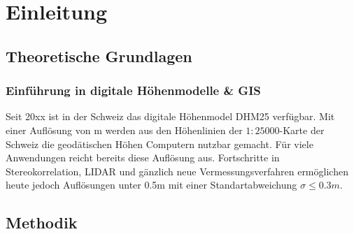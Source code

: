 \section{Einleitung}
\subsection{Theoretische Grundlagen}
\subsubsection{Einführung in digitale Höhenmodelle \& GIS}
Seit 20xx ist in der Schweiz das digitale Höhenmodel DHM25 verfügbar. Mit einer Auflösung von m werden aus den Höhenlinien der $1 : 25000$-Karte der Schweiz die geodätischen Höhen Computern nutzbar gemacht.
Für viele Anwendungen reicht bereits diese Auflösung aus. Fortschritte in Stereokorrelation, LIDAR und gänzlich neue Vermessungsverfahren ermöglichen heute jedoch Auflösungen unter 0.5\unit{m} mit einer Standartabweichung $\sigma \leq 0.3\unit{m}$.

\subsection{Methodik}
\lipsum[6-10]
